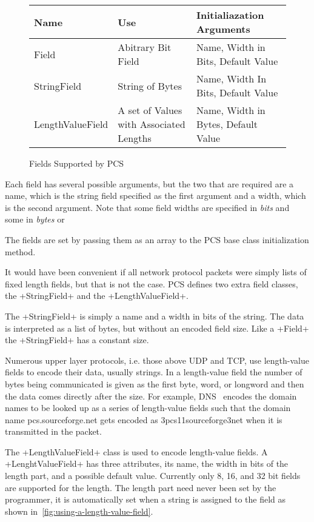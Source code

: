 \documentclass[11pt]{article}
\begin{document}
\begin{figure}
  \centering
  \begin{tabular}{|l|l|l|}
    \hline
    Name & Use & Initialiazation Arguments\\
    \hline
    Field & Abitrary Bit Field & Name, Width in Bits, Default Value\\
    \hline
    StringField & String of Bytes & Name, Width In Bits, Default Value\\
    \hline
    LengthValueField & A set of Values with Associated Lengths & Name,
    Width in Bytes, Default Value\\
    \hline
  \end{tabular}
  \caption{Fields Supported by PCS}
  \label{fig:fields_supported_by_pcs}
\end{figure}

Each field has several possible arguments, but the two that are
required are a name, which is the string field specified as the first
argument and a width, which is the second argument.  Note that some
field widths are specified in \emph{bits} and some in \emph{bytes} or

The fields are set by passing them as an array to the PCS base class
initialization method.

It would have been convenient if all network protocol packets were
simply lists of fixed length fields, but that is not the case.  PCS
defines two extra field classes, the \class+StringField+ and the
\class+LengthValueField+.

The \class+StringField+ is simply a name and a width in bits of the
string.  The data is interpreted as a list of bytes, but without an
encoded field size.  Like a \class+Field+ the \class+StringField+ has
a constant size.

Numerous upper layer protocols, i.e. those above UDP and TCP, use
length-value fields to encode their data, usually strings.  In a
length-value field the number of bytes being communicated is given as
the first byte, word, or longword and then the data comes directly
after the size.  For example, DNS~\cite{rfc1035} encodes the domain
names to be looked up as a series of length-value fields such that the
domain name pcs.sourceforge.net gets encoded as 3pcs11sourceforge3net
when it is transmitted in the packet.

The \class+LengthValueField+ class is used to encode length-value
fields.  A \class+LenghtValueField+ has three attributes, its name,
the width in bits of the length part, and a possible default value.
Currently only 8, 16, and 32 bit fields are supported for the length.
The length part need never been set by the programmer, it is
automatically set when a string is assigned to the field as shown
in~\ref{fig:using-a-length-value-field}.
\end{document}
